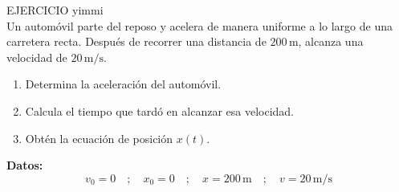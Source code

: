 

  
 \begin{multicols}{2}
    \begin{excercise}[][][]{}{
            EJERCICIO yimmi\\
            Un automóvil parte del reposo y acelera de manera uniforme a lo largo de una carretera recta.  
            Después de recorrer una distancia de $200 \, \text{m}$, alcanza una velocidad de $20 \, \text{m/s}$.
            \begin{enumerate}
                \item Determina la aceleración del automóvil.
                \item Calcula el tiempo que tardó en alcanzar esa velocidad.
                \item Obtén la ecuación de posición $x(t)$.
            \end{enumerate}
            \noindent\textbf{Datos:}
            \[
            v_0 = 0 \quad ; \quad x_0 = 0 \quad ; \quad x = 200 \, \text{m} \quad ; \quad v = 20 \, \text{m/s}
            \]
        }
    \end{excercise}
 \end{multicols}
